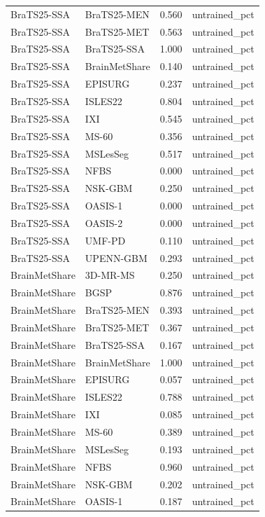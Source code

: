 \begin{tabular}{llrl}
BraTS25-SSA & BraTS25-MEN & 0.560 & untrained\_pct \\
BraTS25-SSA & BraTS25-MET & 0.563 & untrained\_pct \\
BraTS25-SSA & BraTS25-SSA & 1.000 & untrained\_pct \\
BraTS25-SSA & BrainMetShare & 0.140 & untrained\_pct \\
BraTS25-SSA & EPISURG & 0.237 & untrained\_pct \\
BraTS25-SSA & ISLES22 & 0.804 & untrained\_pct \\
BraTS25-SSA & IXI & 0.545 & untrained\_pct \\
BraTS25-SSA & MS-60 & 0.356 & untrained\_pct \\
BraTS25-SSA & MSLesSeg & 0.517 & untrained\_pct \\
BraTS25-SSA & NFBS & 0.000 & untrained\_pct \\
BraTS25-SSA & NSK-GBM & 0.250 & untrained\_pct \\
BraTS25-SSA & OASIS-1 & 0.000 & untrained\_pct \\
BraTS25-SSA & OASIS-2 & 0.000 & untrained\_pct \\
BraTS25-SSA & UMF-PD & 0.110 & untrained\_pct \\
BraTS25-SSA & UPENN-GBM & 0.293 & untrained\_pct \\
BrainMetShare & 3D-MR-MS & 0.250 & untrained\_pct \\
BrainMetShare & BGSP & 0.876 & untrained\_pct \\
BrainMetShare & BraTS25-MEN & 0.393 & untrained\_pct \\
BrainMetShare & BraTS25-MET & 0.367 & untrained\_pct \\
BrainMetShare & BraTS25-SSA & 0.167 & untrained\_pct \\
BrainMetShare & BrainMetShare & 1.000 & untrained\_pct \\
BrainMetShare & EPISURG & 0.057 & untrained\_pct \\
BrainMetShare & ISLES22 & 0.788 & untrained\_pct \\
BrainMetShare & IXI & 0.085 & untrained\_pct \\
BrainMetShare & MS-60 & 0.389 & untrained\_pct \\
BrainMetShare & MSLesSeg & 0.193 & untrained\_pct \\
BrainMetShare & NFBS & 0.960 & untrained\_pct \\
BrainMetShare & NSK-GBM & 0.202 & untrained\_pct \\
BrainMetShare & OASIS-1 & 0.187 & untrained\_pct \\

\end{tabular}
